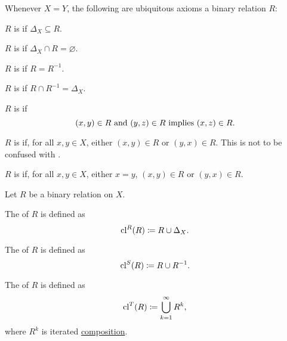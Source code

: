 \begin{definition}
  Whenever \( X = Y \), the following are ubiquitous axioms a binary relation \( R \):
  \begin{DefEnum}[resume=def:binary_relation]
     \( R \) is  if \( \Delta_X \subseteq R \).

     \( R \) is  if \( \Delta_X \cap R = \varnothing \).

     \( R \) is  if \( R = R^{-1} \).

     \( R \) is  if \( R \cap R^{-1} = \Delta_X \).

     \( R \) is  if
    \begin{equation*}
      (x, y) \in R \text{ and } (y, z) \in R \text{ implies } (x, z) \in R.
    \end{equation*}

     \( R \) is  if, for all \( x, y \in X \), either \( (x, y) \in R \) or \( (y, x) \in R \). This is not to be confused with .

     \( R \) is  if, for all \( x, y \in X \), either \( x = y \), \( (x, y) \in R \) or \( (y, x) \in R \).
  \end{DefEnum}
\end{definition}

\begin{definition}\label{def:derived_relations}
  Let \( R \) be a binary relation on \( X \).

  \begin{DefEnum}
     The  of \( R \) is defined as
    \begin{equation*}
      \operatorname{cl}^R(R) \coloneqq R \cup \Delta_X.
    \end{equation*}

     The  of \( R \) is defined as
    \begin{equation*}
      \operatorname{cl}^S(R) \coloneqq R \cup R^{-1}.
    \end{equation*}

     The  of \( R \) is defined as
    \begin{equation*}
      \operatorname{cl}^T(R) \coloneqq \bigcup_{k=1}^\infty R^k,
    \end{equation*}
    where \( R^k \) is iterated \hyperref[def:binary_relation/composition]{composition}.
  \end{DefEnum}
\end{definition}

